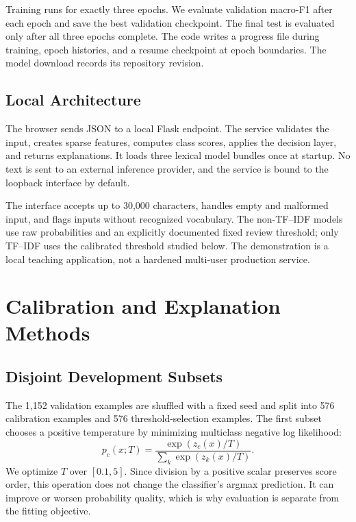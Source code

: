 \documentclass[11pt]{article}
\begin{document}
Training runs for exactly three epochs. We evaluate validation macro-F1 after each epoch and save the best validation checkpoint. The final test is evaluated only after all three epochs complete. The code writes a progress file during training, epoch histories, and a resume checkpoint at epoch boundaries. The model download records its repository revision.

\subsection{Local Architecture}
The browser sends JSON to a local Flask endpoint. The service validates the input, creates sparse features, computes class scores, applies the decision layer, and returns explanations. It loads three lexical model bundles once at startup. No text is sent to an external inference provider, and the service is bound to the loopback interface by default.

\begin{center}
\end{center}

The interface accepts up to 30,000 characters, handles empty and malformed input, and flags inputs without recognized vocabulary. The non-TF--IDF models use raw probabilities and an explicitly documented fixed review threshold; only TF--IDF uses the calibrated threshold studied below. The demonstration is a local teaching application, not a hardened multi-user production service.
\clearpage
\section{Calibration and Explanation Methods}
\subsection{Disjoint Development Subsets}
The 1,152 validation examples are shuffled with a fixed seed and split into 576 calibration examples and 576 threshold-selection examples. The first subset chooses a positive temperature by minimizing multiclass negative log likelihood:
\begin{equation}
p_c(x;T)=\frac{\exp(z_c(x)/T)}{\sum_k\exp(z_k(x)/T)}.
\end{equation}
We optimize $T$ over $[0.1,5]$. Since division by a positive scalar preserves score order, this operation does not change the classifier's argmax prediction. It can improve or worsen probability quality, which is why evaluation is separate from the fitting objective.
\end{document}
